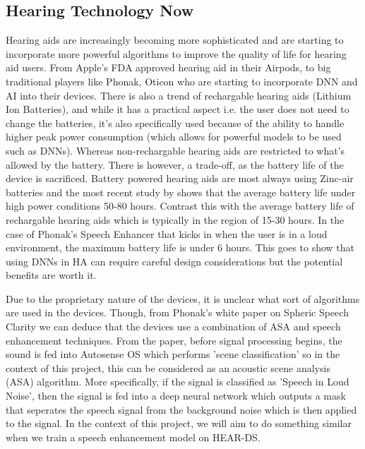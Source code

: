 \documentclass[logo,bsc,singlespacing,parskip,online]{infthesis}
\begin{document}
\subsection{Hearing Technology Now}
Hearing aids are increasingly becoming more sophisticated and are starting to incorporate more powerful 
algorithms to improve the quality of life for hearing aid users. From Apple's FDA approved hearing aid in 
their Airpods, to big traditional players like Phonak, Oticon who are starting to incorporate 
DNN and AI into their devices. There is also a trend of rechargable hearing aids (Lithium Ion Batteries), and while 
it has a practical aspect i.e. the user does not need to change the batteries, it's also 
specifically used because of the ability to handle higher peak power consumption (which allows for powerful models to be used such as DNNs).
Whereas non-rechargable hearing aids are restricted to what's allowed by the battery. There is however, a trade-off,
as the battery life of the device is sacrificed. Battery powered hearing aids 
are most always using Zinc-air batteries \cite{sparkes_study_1997} \cite{mir_evaluation_2023} 
and the most recent study by \citet{thomas_zincair_2024} shows that the average battery life 
under high power conditions 50-80 hours. Contrast this with the average battery life of 
rechargable hearing aids which is typically in the region of 15-30 hours. In the case of 
Phonak's Speech Enhancer that kicks in when the user is in a loud environment, the 
maximum battery life is under 6 hours. This goes to show that 
using DNNs in HA can require careful design considerations but the potential benefits 
are worth it.


Due to the proprietary nature of the devices, it is unclear what sort of 
algorithms are used in the devices. Though, from Phonak's white paper on Spheric Speech Clarity \cite{Hasemann2024PhonakSphere}
we can deduce that the devices use a combination of ASA and speech enhancement techniques.
From the paper, before signal processing begins, the sound is fed into Autosense OS which 
performs 'scene classification' so in the context of this project, this can be 
considered as an acoustic scene analysis (ASA) algorithm. More specifically, if 
the signal is classified as 'Speech in Loud Noise', then the signal is fed into a 
deep neural network which outputs a mask that seperates the speech signal from the background noise 
which is then applied to the signal. In the context of this project, we will aim to do something similar 
when we train a speech enhancement model on HEAR-DS. 
\end{document}
